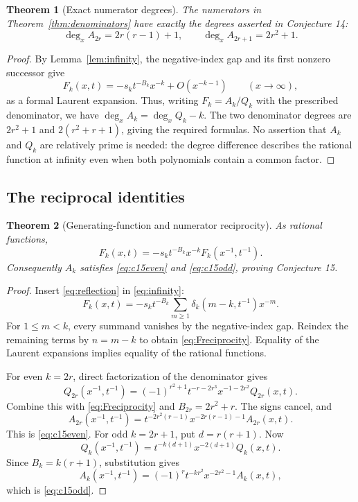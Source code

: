 \documentclass[11pt,letterpaper]{article}
\numberwithin{equation}{section}
\newtheorem{theorem}{Theorem}[section]
\theoremstyle{definition}
\begin{document}
\begin{theorem}[Exact numerator degrees]\label{thm:degrees}
The numerators in Theorem~\ref{thm:denominators} have exactly the
degrees asserted in Conjecture 14:
\[
 \deg_xA_{2r}=2r(r-1)+1,\qquad
 \deg_xA_{2r+1}=2r^2+1.
\]
\end{theorem}
\begin{proof}
By Lemma~\ref{lem:infinity}, the negative-index gap and its first
nonzero successor give
\begin{equation}\label{eq:Fleadinginfty}
 F_k(x,t)=-s_k t^{-B_k}x^{-k}+O(x^{-k-1})
 \qquad(x\to\infty),
\end{equation}
as a formal Laurent expansion. Thus, writing \(F_k=A_k/Q_k\) with
the prescribed denominator, we have
\(\deg_xA_k=\deg_xQ_k-k\). The two denominator degrees are
\(2r^2+1\) and \(2(r^2+r+1)\), giving the required formulas.
No assertion that \(A_k\) and \(Q_k\) are relatively prime is needed:
the degree difference describes the rational function at infinity even
when both polynomials contain a common factor.
\end{proof}

\subsection{The reciprocal identities}
\begin{theorem}[Generating-function and numerator reciprocity]\label{thm:reciprocity}
As rational functions,
\begin{equation}\label{eq:Freciprocity}
 F_k(x,t)=-s_k t^{-B_k}x^{-k}F_k(x^{-1},t^{-1}).
\end{equation}
Consequently \(A_k\) satisfies \eqref{eq:c15even} and
\eqref{eq:c15odd}, proving Conjecture 15.
\end{theorem}
\begin{proof}
Insert \eqref{eq:reflection} in \eqref{eq:infinity}:
\[
 F_k(x,t)=-s_k t^{-B_k}\sum_{m\ge1}
                 \delta_k(m-k,t^{-1})x^{-m}.
\]
For \(1\le m<k\), every summand vanishes by the negative-index gap.
Reindex the remaining terms by \(n=m-k\) to obtain
\eqref{eq:Freciprocity}. Equality of the Laurent expansions implies
equality of the rational functions.

For even \(k=2r\), direct factorization of the denominator gives
\begin{equation}\label{eq:Qreceven}
 Q_{2r}(x^{-1},t^{-1})
 =(-1)^{r^2+1}t^{-r-2r^3}x^{-1-2r^2}Q_{2r}(x,t).
\end{equation}
Combine this with \eqref{eq:Freciprocity} and
\(B_{2r}=2r^2+r\). The signs cancel, and
\[
 A_{2r}(x^{-1},t^{-1})
 =t^{-2r^2(r-1)}x^{-2r(r-1)-1}A_{2r}(x,t).
\]
This is \eqref{eq:c15even}.
For odd \(k=2r+1\), put \(d=r(r+1)\). Now
\begin{equation}\label{eq:Qrecodd}
 Q_k(x^{-1},t^{-1})=t^{-k(d+1)}x^{-2(d+1)}Q_k(x,t).
\end{equation}
Since \(B_k=k(r+1)\), substitution gives
\[
 A_k(x^{-1},t^{-1})=(-1)^r
          t^{-kr^2}x^{-2r^2-1}A_k(x,t),
\]
which is \eqref{eq:c15odd}.
\end{proof}
\end{document}
